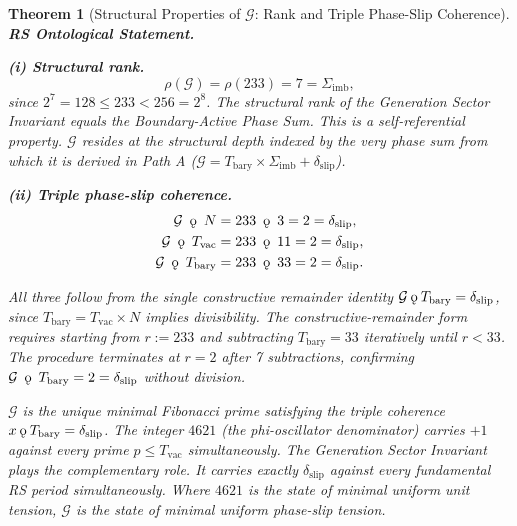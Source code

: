 \documentclass[11pt, letterpaper]{article}
\newcommand{\koppa}{\mathbin{\text{\rm\k{o}}}}
\theoremstyle{definition}
\theoremstyle{plain}
\newtheorem{theorem}{Theorem}[section]
\begin{document}
\begin{theorem}[Structural Properties of $\mathcal{G}$: Rank and Triple Phase-Slip Coherence]

\textbf{RS Ontological Statement.}

\noindent\textbf{(i) Structural rank.}
\begin{equation}
    \rho(\mathcal{G}) = \rho(233) = 7 = \Sigma_\mathrm{imb},
    \label{eq:rank_G}
\end{equation}
since $2^7 = 128 \leq 233 < 256 = 2^8$. The structural rank of the Generation Sector Invariant equals the Boundary-Active Phase Sum. This is a self-referential property. $\mathcal{G}$ resides at the structural depth indexed by the very phase sum from which it is derived in Path A ($\mathcal{G} = T_\mathrm{bary} \times \Sigma_\mathrm{imb} + \delta_\mathrm{slip}$).

\noindent\textbf{(ii) Triple phase-slip coherence.}
\begin{align}
    \mathcal{G} \;\mathbin{\koppa}\; N &= 233 \;\mathbin{\koppa}\; 3 = 2 = \delta_\mathrm{slip}, \label{eq:kop_N}\\
    \mathcal{G} \;\mathbin{\koppa}\; T_\mathrm{vac} &= 233 \;\mathbin{\koppa}\; 11 = 2 = \delta_\mathrm{slip}, \label{eq:kop_Tvac}\\
    \mathcal{G} \;\mathbin{\koppa}\; T_\mathrm{bary} &= 233 \;\mathbin{\koppa}\; 33 = 2 = \delta_\mathrm{slip}. \label{eq:kop_Tbary}
\end{align}

All three follow from the single constructive remainder identity $\mathcal{G} \koppa T_\mathrm{bary} = \delta_\mathrm{slip}$, since $T_\mathrm{bary} = T_\mathrm{vac} \times N$ implies divisibility. The constructive-remainder form requires starting from $r := 233$ and subtracting $T_\mathrm{bary} = 33$ iteratively until $r < 33$. The procedure terminates at $r = 2$ after 7 subtractions, confirming $\mathcal{G} \;\mathbin{\koppa}\; T_\mathrm{bary} = 2 = \delta_\mathrm{slip}$ without division.

$\mathcal{G}$ is the unique minimal Fibonacci prime satisfying the triple coherence $x \koppa T_\mathrm{bary} = \delta_\mathrm{slip}$. The integer $4621$ (the phi-oscillator denominator) carries $+1$ against every prime $p \leq T_\mathrm{vac}$ simultaneously. The Generation Sector Invariant plays the complementary role. It carries exactly $\delta_\mathrm{slip}$ against every fundamental RS period simultaneously. Where $4621$ is the state of minimal uniform unit tension, $\mathcal{G}$ is the state of minimal uniform phase-slip tension.


\end{theorem}
\end{document}
